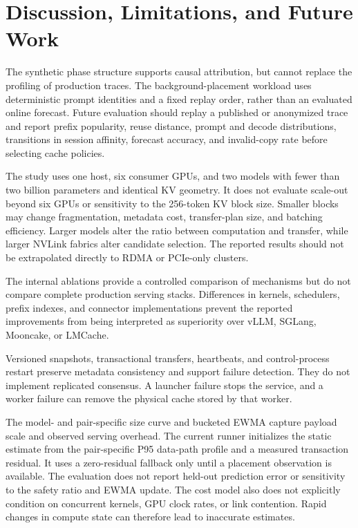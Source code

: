\documentclass{article}
\begin{document}
\section{Discussion, Limitations, and Future Work}
\label{sec:limitations}

The synthetic phase structure supports causal attribution, but cannot replace the profiling of production traces. The background-placement workload uses deterministic prompt identities and a fixed replay order, rather than an evaluated online forecast. Future evaluation should replay a published or anonymized trace and report prefix popularity, reuse distance, prompt and decode distributions, transitions in session affinity, forecast accuracy, and invalid-copy rate before selecting cache policies.

The study uses one host, six consumer GPUs, and two models with fewer than two billion parameters and identical KV geometry. It does not evaluate scale-out beyond six GPUs or sensitivity to the 256-token KV block size. Smaller blocks may change fragmentation, metadata cost, transfer-plan size, and batching efficiency. Larger models alter the ratio between computation and transfer, while larger NVLink fabrics alter candidate selection. The reported results should not be extrapolated directly to RDMA or PCIe-only clusters.

The internal ablations provide a controlled comparison of mechanisms but do not compare complete production serving stacks. Differences in kernels, schedulers, prefix indexes, and connector implementations prevent the reported improvements from being interpreted as superiority over vLLM, SGLang, Mooncake, or LMCache.

Versioned snapshots, transactional transfers, heartbeats, and control-process restart preserve metadata consistency and support failure detection. They do not implement replicated consensus. A launcher failure stops the service, and a worker failure can remove the physical cache stored by that worker.

The model- and pair-specific size curve and bucketed EWMA capture payload scale and observed serving overhead. The current runner initializes the static estimate from the pair-specific P95 data-path profile and a measured transaction residual. It uses a zero-residual fallback only until a placement observation is available. The evaluation does not report held-out prediction error or sensitivity to the safety ratio and EWMA update. The cost model also does not explicitly condition on concurrent kernels, GPU clock rates, or link contention. Rapid changes in compute state can therefore lead to inaccurate estimates.
\end{document}
